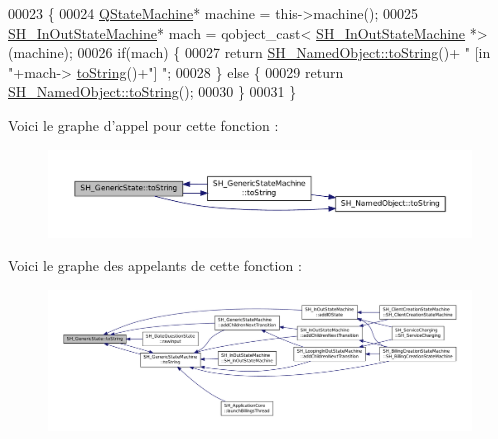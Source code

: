 \begin{DoxyCode}
00023 \{
00024     \hyperlink{classQStateMachine}{QStateMachine}* machine = this->machine();
00025     \hyperlink{classSH__InOutStateMachine}{SH\_InOutStateMachine}* mach = qobject\_cast<
      \hyperlink{classSH__InOutStateMachine}{SH\_InOutStateMachine} *>(machine);
00026     \textcolor{keywordflow}{if}(mach) \{
00027         \textcolor{keywordflow}{return} \hyperlink{classSH__NamedObject_a9f4b19df6a96a17daaf1060b3019ef47}{SH\_NamedObject::toString}()+ \textcolor{stringliteral}{" [in "}+mach->
      \hyperlink{classSH__GenericStateMachine_a85c0c1c9d258ae991f84667412fa47cd}{toString}()+\textcolor{stringliteral}{"] "};
00028     \} \textcolor{keywordflow}{else} \{
00029         \textcolor{keywordflow}{return} \hyperlink{classSH__NamedObject_a9f4b19df6a96a17daaf1060b3019ef47}{SH\_NamedObject::toString}();
00030     \}
00031 \}
\end{DoxyCode}


Voici le graphe d'appel pour cette fonction \-:\nopagebreak
\begin{figure}[H]
\begin{center}
\leavevmode
\includegraphics[width=350pt]{classSH__GenericState_a7779babbb40f3f8faa71112204d9804f_cgraph}
\end{center}
\end{figure}




Voici le graphe des appelants de cette fonction \-:\nopagebreak
\begin{figure}[H]
\begin{center}
\leavevmode
\includegraphics[width=350pt]{classSH__GenericState_a7779babbb40f3f8faa71112204d9804f_icgraph}
\end{center}
\end{figure}


